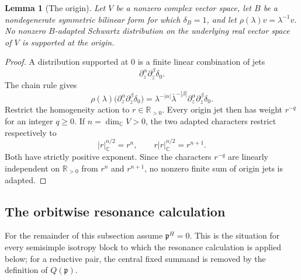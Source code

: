 \documentclass[11pt,reqno]{amsart}
\numberwithin{equation}{section}
\newtheorem{lemma}[theorem]{Lemma}
\theoremstyle{definition}
\theoremstyle{remark}
\newcommand{\C}{\mathbb C}
\newcommand{\R}{\mathbb R}
\newcommand{\fp}{\mathfrak p}
\begin{document}
\begin{lemma}[The origin]
\label{core:lem:origin-adapted}
Let $V$ be a nonzero complex vector space, let $B$ be a nondegenerate
symmetric bilinear form for which $\delta_B=1$, and let
$\rho(\lambda)v=\lambda^{-1}v$.  No nonzero $B$-adapted Schwartz
distribution on the underlying real vector space of $V$ is supported at the
origin.
\end{lemma}

\begin{proof}
A distribution supported at $0$ is a finite linear combination of jets
\[
  \partial_z^\alpha\partial_{\bar z}^\beta\delta_0.
\]
The chain rule gives
\[
 \rho(\lambda)
 \bigl(\partial_z^\alpha\partial_{\bar z}^\beta\delta_0\bigr)
 =\lambda^{-|\alpha|}\bar\lambda^{-|\beta|}
 \partial_z^\alpha\partial_{\bar z}^\beta\delta_0.
\]
Restrict the homogeneity action to $r\in\R_{>0}$.  Every origin jet then has
weight $r^{-q}$ for an integer $q\geq0$.  If $n=\dim_\C V>0$, the two adapted
characters restrict respectively to
\[
  |r|_\C^{n/2}=r^n,
  \qquad
  r|r|_\C^{n/2}=r^{n+1}.
\]
Both have strictly positive exponent.  Since the characters $r^{-q}$ are
linearly independent on $\R_{>0}$ from $r^n$ and $r^{n+1}$, no nonzero finite
sum of origin jets is adapted.
\end{proof}

\subsection{The orbitwise resonance calculation}

For the remainder of this subsection assume $\fp^H=0$.  This is the situation
for every semisimple isotropy block to which the resonance calculation is
applied below; for a reductive pair, the central fixed summand is removed by
the definition of $Q(\fp)$.
\end{document}
